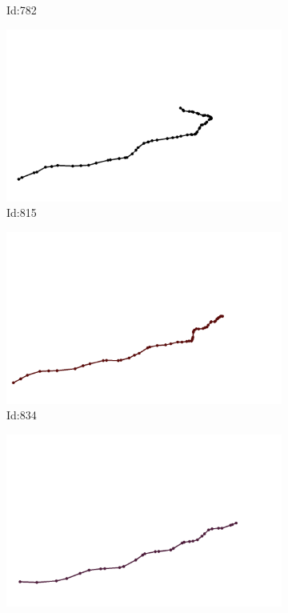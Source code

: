 \documentclass[12pt,twoside]{report}
\begin{document}
\begin{figure}
\begin{subfigure}[b]{0.20\textwidth}
\caption{Id:782}
\end{subfigure}
\begin{subfigure}[b]{0.20\textwidth}
\centering
\includegraphics[width=\textwidth]{../trajectories/815.png}
\caption{Id:815}
\end{subfigure}
\begin{subfigure}[b]{0.20\textwidth}
\centering
\includegraphics[width=\textwidth]{../trajectories/834.png}
\caption{Id:834}
\end{subfigure}
\begin{subfigure}[b]{0.20\textwidth}
\centering
\includegraphics[width=\textwidth]{../trajectories/858.png}

\end{subfigure}
\end{figure}
\end{document}
